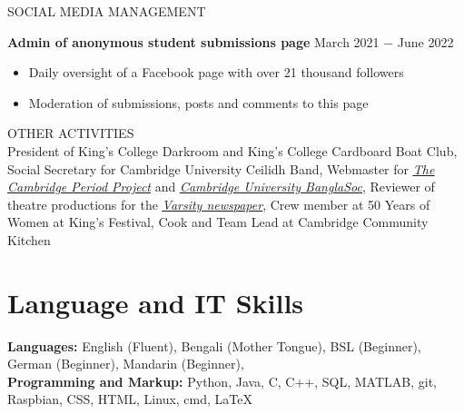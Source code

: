 \documentclass{article}
\begin{document}
\uppercase{Social Media Management}

\textbf{Admin of anonymous student submissions page }\hfill March 2021 $-$ June 2022
\begin{itemize}
    \item Daily oversight of a Facebook page with over 21 thousand followers
    \item Moderation of submissions, posts and comments to this page
\end{itemize} \medskip

\uppercase{Other Activities}\\
President of King's College Darkroom and King's College Cardboard Boat Club, Social Secretary for Cambridge University Ceilidh Band, Webmaster for \href{http://tcpp.soc.srcf.net/}{\underline{\textit{The Cambridge Period Project}}} and \href{https://cambridgebanglasoc.org/}{\underline{\textit{Cambridge University BanglaSoc}}}, Reviewer of theatre productions for the \href{https://www.varsity.co.uk/profile/sheamol-obeda}{\underline{\textit{Varsity newspaper}}}, Crew member at 50 Years of Women at King's Festival, Cook and Team Lead at Cambridge Community Kitchen

\medskip

\vspace{-.75\baselineskip}
\hrulefill
\vspace{-.75\baselineskip}

\section*{Language and IT Skills}
\textbf{Languages:} English (Fluent), Bengali (Mother Tongue), 
BSL (Beginner),
German (Beginner), 
Mandarin (Beginner),  \\
\textbf{Programming and Markup:} Python, Java, C, C++, SQL, MATLAB, git, Raspbian, CSS, HTML, Linux, cmd, \LaTeX\medskip

\vspace{-.75\baselineskip}
\hrulefill
\vspace{-.75\baselineskip}
\end{document}
